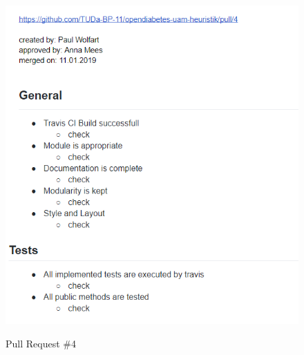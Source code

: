 \documentclass[accentcolor=tud0b,12pt,paper=a4]{tudreport}
\begin{document}
\begin{figure}[h]
\centering
\caption{Pull Request \#4}
\includegraphics[width=\textwidth,height=\textheight,keepaspectratio]{pr-4}
\label{pr:4}
\end{figure}
\end{document}
